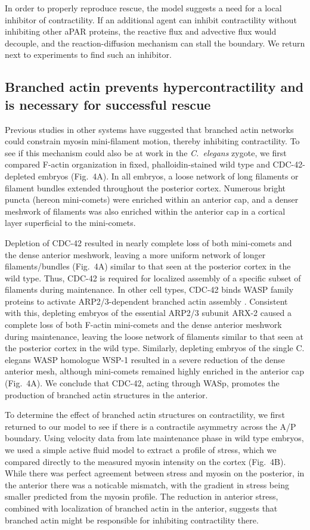 \documentclass[11pt]{article}
\newcommand{\6}[1]{#1_{\text{6}}}
\newcommand{\3}[1]{#1_{\text{3}}}
\begin{document}
In order to properly reproduce rescue, the model suggests a need for a local inhibitor of contractility. If an additional agent can inhibit contractility without inhibiting other aPAR proteins, the reactive flux and advective flux would decouple, and the reaction-diffusion mechanism can stall the boundary. We return next to experiments to find such an inhibitor.

\subsection*{Branched actin prevents hypercontractility and is necessary for successful rescue}
Previous studies in other systems \citep{yang2012arp2, muresan2022f} have suggested that branched actin networks could constrain myosin mini-filament motion, thereby inhibiting contractility. To see if this mechanism could also be at work in the \emph{C.\ elegans} zygote, we first compared F-actin organization in fixed, phalloidin-stained wild type and CDC-42-depleted embryos (Fig.\ 4A). In all embryos, a loose network of long filaments or filament bundles extended throughout the posterior cortex. Numerous bright puncta (hereon mini-comets) were enriched within an anterior cap, and a denser meshwork of filaments was also enriched within the anterior cap in a cortical layer superficial to the mini-comets.

Depletion of CDC-42 resulted in nearly complete loss of both mini-comets and the dense anterior meshwork, leaving a more uniform network of longer filaments/bundles (Fig.\ 4A) similar to that seen at the posterior cortex in the wild type. Thus, CDC-42 is required for localized assembly of a specific subset of filaments during maintenance. In other cell types, CDC-42 binds WASP family proteins to activate ARP2/3-dependent branched actin assembly \citep{pollitt2009wasp}. Consistent with this, depleting embryos of the essential ARP2/3 subunit ARX-2 caused a complete loss of both F-actin mini-comets and the dense anterior meshwork during maintenance, leaving the loose network of filaments similar to that seen at the posterior cortex in the wild type. Similarly, depleting embryos of the single C. elegans WASP homologue WSP-1 resulted in a severe reduction of the dense anterior mesh, although mini-comets remained highly enriched in the anterior cap (Fig.\ 4A). We conclude that CDC-42, acting through WASp, promotes the production of branched actin structures in the anterior.

To determine the effect of branched actin structures on contractility, we first returned to our model to see if there is a contractile asymmetry across the A/P boundary. Using velocity data from late maintenance phase in wild type embryos, we used a simple active fluid model \citep{mayer2010anisotropies} to extract a profile of stress, which we compared directly to the measured myosin intensity on the cortex (Fig.\ 4B). While there was perfect agreement between stress and myosin on the posterior, in the anterior there was a noticable mismatch, with the gradient in stress being smaller predicted from the myosin profile. The reduction in anterior stress, combined with localization of branched actin in the anterior, suggests that branched actin might be responsible for inhibiting contractility there. 
\end{document}
